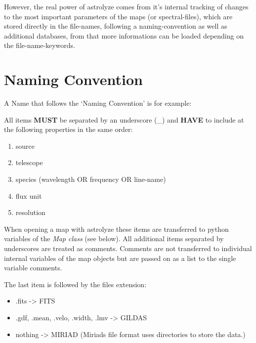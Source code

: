 \documentclass[a4paper,10pt,english]{sphinxmanual}
\begin{document}
However, the real power of astrolyze comes from it's internal tracking of
changes to the most important parameters of the maps (or spectral-files), which
are stored directly in the file-names, following a naming-convention as well as
additional databases, from that more informations can be loaded depending on
the file-name-keywords.


\section{Naming Convention}
\label{manual:label-naming-convention}\label{manual:naming-convention}
A Name that follows the `Naming Convention' is for example:

All items \textbf{MUST} be separated by an underscore (\_) and \textbf{HAVE} to include at
the following properties in the same order:
\begin{enumerate}
\item {} 
source

\item {} 
telescope

\item {} 
species (wavelength OR frequency OR line-name)

\item {} 
flux unit

\item {} 
resolution

\end{enumerate}

When opening a map with astrolyze these items are transferred to python
variables of the \emph{Map class} (see below).  All additional items
separated by underscores are treated as comments. Comments are not
transferred to individual internal variables of the map objects but are passed
on as a list to the single variable comments.

The last item is followed by the files extension:
\begin{itemize}
\item {} 
.fits -\textgreater{} FITS

\item {} 
.gdf, .mean, .velo, .width, .lmv -\textgreater{} GILDAS

\item {} 
nothing -\textgreater{} MIRIAD (Miriads file format uses directories to store the data.)

\end{itemize}
\end{document}
